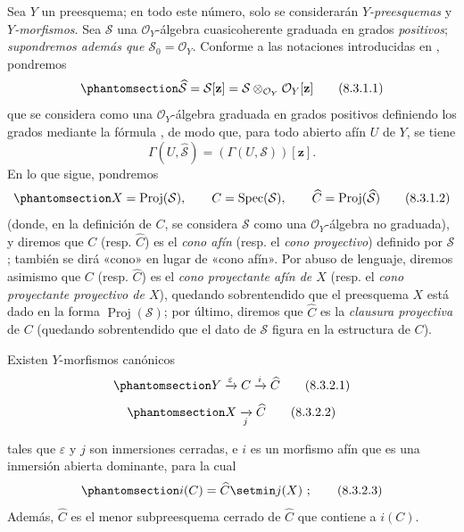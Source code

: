 \documentclass[oneside,10pt]{amsart}
\newcommand{\oldpage}[2][]{\marginnote{\normalfont\footnotesize\textbf{#1}~|~#2}\ignorespaces}
\let\EGAOriginalLabel\label
\renewcommand{\label}[1]{\phantomsection\EGAOriginalLabel{#1}}
\begin{document}
\begin{env}[8.3.1]
\label{II.8.3.1-fr}
Sea $Y$ un preesquema;
en todo este número, solo se considerarán \emph{$Y$-preesquemas} y \emph{$Y$-morfismos}.
Sea $\mathcal{S}$ una $\mathcal{O}_Y$-álgebra cuasicoherente graduada en grados \emph{positivos};
\emph{supondremos además que $\mathcal{S}_0=\mathcal{O}_Y$}.
Conforme a las notaciones introducidas en , pondremos
\begin{equation}
\label{II.8.3.1.1-fr}
  \widehat{\mathcal{S}}=\mathcal{S}[\mathbf{z}]
  =\mathcal{S}\otimes_{\mathcal{O}_Y}\mathcal{O}_Y[\mathbf{z}]
\tag{8.3.1.1}
\end{equation}
que se considera como una $\mathcal{O}_Y$-álgebra graduada en grados positivos definiendo los grados mediante la fórmula , de modo que, para todo abierto afín $U$ de $Y$, se tiene
\[
  \Gamma(U,\widehat{\mathcal{S}})=(\Gamma(U,\mathcal{S}))[\mathbf{z}].
\]
En lo que sigue, pondremos
\begin{equation}
\label{II.8.3.1.2-fr}
  X=\operatorname{Proj}(\mathcal{S}),\qquad
  C=\operatorname{Spec}(\mathcal{S}),\qquad
  \widehat{C}=\operatorname{Proj}(\widehat{\mathcal{S}})
\tag{8.3.1.2}
\end{equation}
(donde, en la definición de $C$, se considera $\mathcal{S}$ como una $\mathcal{O}_Y$-álgebra no graduada), y diremos que $C$ (resp. $\widehat{C}$) es el \emph{cono afín} (resp. el \emph{cono proyectivo}) definido por $\mathcal{S}$;
también se dirá «cono» en lugar de «cono afín».
Por abuso de lenguaje, diremos asimismo que $C$ (resp. $\widehat{C}$) es el \emph{cono proyectante afín de $X$} (resp. el \emph{cono proyectante proyectivo de $X$}), quedando sobrentendido que el preesquema $X$ está dado en la forma $\operatorname{Proj}(\mathcal{S})$;
por último, diremos que $\widehat{C}$ es la \emph{clausura proyectiva} de $C$ (quedando sobrentendido que el dato de $\mathcal{S}$ figura en la estructura de $C$).
\end{env}
\begin{proposition}[8.3.2]
\label{II.8.3.2-fr}
Existen $Y$-morfismos canónicos
\begin{equation}
\label{II.8.3.2.1-fr}
  Y\xrightarrow{\varepsilon}C\xrightarrow{i}\widehat{C}
\tag{8.3.2.1}
\end{equation}
\begin{equation}
\label{II.8.3.2.2-fr}
  X\xrightarrow[j]{}\widehat{C}
\tag{8.3.2.2}
\end{equation}

\oldpage[II]{163}
tales que $\varepsilon$ y $j$ son inmersiones cerradas, e $i$ es un morfismo afín que es una inmersión abierta dominante, para la cual
\begin{equation}
\label{II.8.3.2.3-fr}
  i(C)=\widehat{C}\setmin j(X)~;
\tag{8.3.2.3}
\end{equation}
Además, $\widehat{C}$ es el menor subpreesquema cerrado de $\widehat{C}$ que contiene a $i(C)$.
\end{proposition}
\end{document}
